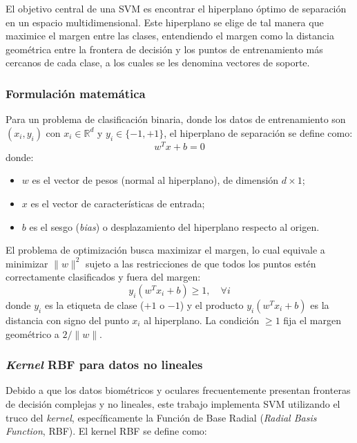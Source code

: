 El objetivo central de una SVM es encontrar el hiperplano óptimo de separación en un espacio multidimensional. Este hiperplano se elige de tal manera que maximice el margen entre las clases, entendiendo el margen como la distancia geométrica entre la frontera de decisión y los puntos de entrenamiento más cercanos de cada clase, a los cuales se les denomina vectores de soporte.

\subsubsection{Formulación matemática}

Para un problema de clasificación binaria, donde los datos de entrenamiento son $(x_i, y_i)$ con $x_i \in \mathbb{R}^d$ y $y_i \in \{-1, +1\}$, el hiperplano de separación se define como:
\begin{equation}
	w^T x + b = 0 \tag{13}
\end{equation}
donde:
\begin{itemize}
	\item $w$ es el vector de pesos (normal al hiperplano), de dimensión $d \times 1$;
	\item $x$ es el vector de características de entrada;
	\item $b$ es el sesgo (\textit{bias}) o desplazamiento del hiperplano respecto al origen.
\end{itemize}

El problema de optimización busca maximizar el margen, lo cual equivale a minimizar $\|w\|^2$ sujeto a las restricciones de que todos los puntos estén correctamente clasificados y fuera del margen:
\begin{equation}
	y_i(w^T x_i + b) \geq 1, \quad \forall i \tag{14}
\end{equation}
donde $y_i$ es la etiqueta de clase ($+1$ o $-1$) y el producto $y_i(w^T x_i + b)$ es la distancia con signo del punto $x_i$ al hiperplano. La condición $\geq 1$ fija el margen geométrico a $2/\|w\|$.

\subsubsection{\textit{Kernel} RBF para datos no lineales}

Debido a que los datos biométricos y oculares frecuentemente presentan fronteras de decisión complejas y no lineales, este trabajo implementa SVM utilizando el truco del \textit{kernel}, específicamente la Función de Base Radial (\textit{Radial Basis Function}, RBF). El kernel RBF se define como:

